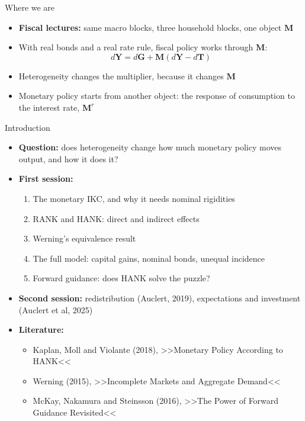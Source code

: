 \documentclass[10pt,english]{beamer}
\begin{document}
\begin{frame}{Where we are}
\begin{itemize}
\item <+->\textbf{Fiscal lectures:} same macro blocks, three household blocks, one object $\boldsymbol{M}$
\item <+->With real bonds and a real rate rule, fiscal policy works through $\boldsymbol{M}$:
\[
d\boldsymbol{Y}=d\boldsymbol{G}+\boldsymbol{M}\left(d\boldsymbol{Y}-d\boldsymbol{T}\right)
\]
\item <+->Heterogeneity changes the multiplier, because it changes $\boldsymbol{M}$
\item <+->Monetary policy starts from another object: the response of consumption to the interest rate, $\boldsymbol{M}^{r}$
\end{itemize}
\end{frame}
%
\begin{frame}{Introduction}
\begin{itemize}
\item <+->\textbf{Question:} does heterogeneity change how much monetary policy moves output, and how it does it?
\item <+->\textbf{First session:}
\begin{enumerate}
\item The monetary IKC, and why it needs nominal rigidities
\item RANK and HANK: direct and indirect effects
\item Werning's equivalence result
\item The full model: capital gains, nominal bonds, unequal incidence
\item Forward guidance: does HANK solve the puzzle?
\end{enumerate}
\item <+->\textbf{Second session:} redistribution (Auclert, 2019), expectations and investment (Auclert et al, 2025)
\item <+->\textbf{Literature:}
\begin{itemize}
\item Kaplan, Moll and Violante (2018), >>Monetary Policy According to HANK<<
\item Werning (2015), >>Incomplete Markets and Aggregate Demand<<
\item McKay, Nakamura and Steinsson (2016), >>The Power of Forward Guidance Revisited<<
\end{itemize}
\end{itemize}
\end{frame}
%
\end{document}
